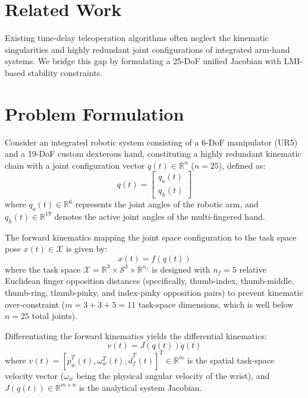 \documentclass[letterpaper,journal]{IEEEtran}
\begin{document}
\section{Related Work}
Existing time-delay teleoperation algorithms often neglect the kinematic singularities and highly redundant joint configurations of integrated arm-hand systems. We bridge this gap by formulating a 25-DoF unified Jacobian with LMI-based stability constraints.

\section{Problem Formulation}

Consider an integrated robotic system consisting of a 6-DoF manipulator (UR5) and a 19-DoF custom dexterous hand, constituting a highly redundant kinematic chain with a joint configuration vector $q(t) \in \mathbb{R}^n$ ($n = 25$), defined as:
\begin{equation}
q(t) = \begin{bmatrix} q_a(t) \\ q_h(t) \end{bmatrix}
\end{equation}
where $q_a(t) \in \mathbb{R}^6$ represents the joint angles of the robotic arm, and $q_h(t) \in \mathbb{R}^{19}$ denotes the active joint angles of the multi-fingered hand. 

The forward kinematics mapping the joint space configuration to the task space pose $x(t) \in \mathcal{X}$ is given by:
\begin{equation}
x(t) = f(q(t))
\end{equation}
where the task space $\mathcal{X} = \mathbb{R}^3 \times \mathcal{S}^3 \times \mathbb{R}^{n_f}$ is designed with $n_f = 5$ relative Euclidean finger opposition distances (specifically, thumb-index, thumb-middle, thumb-ring, thumb-pinky, and index-pinky opposition pairs) to prevent kinematic over-constraint ($m = 3 + 3 + 5 = 11$ task-space dimensions, which is well below $n = 25$ total joints). 

Differentiating the forward kinematics yields the differential kinematics:
\begin{equation}
v(t) = J(q(t))\dot{q}(t)
\end{equation}
where $v(t) = [\dot{p}_w^T(t), \omega_w^T(t), \dot{d}_f^T(t)]^T \in \mathbb{R}^m$ is the spatial task-space velocity vector ($\omega_w$ being the physical angular velocity of the wrist), and $J(q(t)) \in \mathbb{R}^{m \times n}$ is the analytical system Jacobian.
\end{document}
